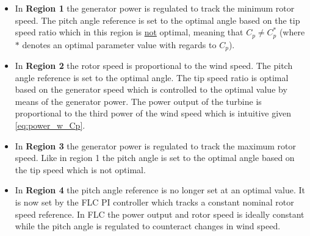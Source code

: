 \begin{itemize}
	\item In \textbf{Region 1} the generator power is regulated to track the minimum rotor speed. The pitch angle reference is set to the optimal angle based on the tip speed ratio which in this region is \underline{not} optimal, meaning that $ C_p \neq C_p^* $ (where $ * $ denotes an optimal parameter value with regards to $ C_p $). 
	\item In \textbf{Region 2} the rotor speed is proportional to the wind speed. The pitch angle reference is set to the optimal angle. The tip speed ratio is optimal based on the generator speed which is controlled to the optimal value by means of the generator power. The power output of the turbine is proportional to the third power of the wind speed which is intuitive given \cref{eq:power_w_Cp}.
	\item In \textbf{Region 3} the generator power is regulated to track the maximum rotor speed. Like in region 1 the pitch angle is set to the optimal angle based on the tip speed which is not optimal.
	\item In \textbf{Region 4} the pitch angle reference is no longer set at an optimal value. It is now set by the FLC PI controller which tracks a constant nominal rotor speed reference. In FLC the power output and rotor speed is ideally constant while the pitch angle is regulated to counteract changes in wind speed.
\end{itemize}



